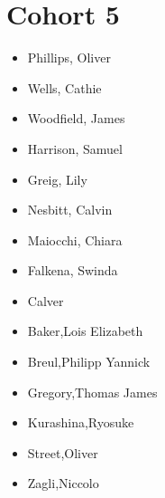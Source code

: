 \documentclass{article}
\begin{document}
\section*{Cohort 5}
\begin{itemize}
    \item Phillips, Oliver 
    \item Wells, Cathie \cite{wells2021reducing}
    \item Woodfield, James
    \item Harrison, Samuel
    \item Greig, Lily
    \item Nesbitt, Calvin
    \item Maiocchi, Chiara
    \item Falkena, Swinda \cite{falkena2021delay, falkena2020revisiting, falkena2019derivation}
    \item Calver
    \item Baker,Lois Elizabeth
    \item Breul,Philipp Yannick
    \item Gregory,Thomas James
    \item Kurashina,Ryosuke
    \item Street,Oliver
    \item Zagli,Niccolo \cite{lucarini2020response}
\end{itemize}

\end{document}
